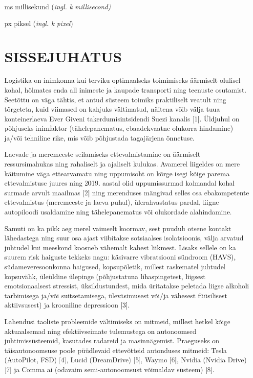 \documentclass[12pt,a4paper]{report}
\begin{document}
ms millisekund (\emph{ingl. k} \emph{millisecond)}

px piksel (\emph{ingl. k pixel})

\section*{SISSEJUHATUS}\label{sissejuhatus}

Logistika on inimkonna kui terviku optimaalseks toimimiseks äärmiselt olulisel kohal, hõlmates enda all inimeste ja kaupade transporti ning teenuste osutamist. Seetõttu on väga tähtis, et antud süsteem toimiks praktiliselt veatult ning tõrgeteta, kuid viimased on kahjuks vältimatud, näitena võib välja tuua konteinerlaeva Ever Giveni takerdumisintsidendi Suezi kanalis {[}1{]}. Üldjuhul on põhjuseks inimfaktor (tähelepanematus, ebaadekvaatne olukorra hindamine) ja/või tehniline rike, mis võib põhjustada tagajärjena õnnetuse.

Laevade ja meremeeste seilamiseks ettevalmistamine on äärmiselt ressursimahukas ning rahaliselt ja ajaliselt kulukas. Avamerel liigeldes on mere käitumine väga ettearvamatu ning uppumisoht on kõrge isegi kõige parema ettevalmistuse juures ning 2019. aastal olid uppumissurmad kolmandal kohal surmade arvult maailmas {[}2{]} ning merenduses mängivad selles osa ebakompetente ettevalmistus (meremeeste ja laeva puhul), ülerahvastatus pardal, liigne autopiloodi usaldamine ning tähelepanematus või olukordade alahindamine.

Samuti on ka pikk aeg merel vaimselt koormav, sest puudub otsene kontakt lähedastega ning suur osa ajast viibitakse sotsiaalses isolatsioonis, välja arvatud juhtudel kui meeskond koosneb vähemalt kahest liikmest. Lisaks sellele on ka suurem risk haiguste tekkeks nagu: käsivarre vibratsiooni sündroom (HAVS), südameveresoonkonna haigused, kopsupõletik, millest raskematel juhtudel kopsuvähk, üleüldine ülepinge (põhjustatuna lihaspingetest, liigsest emotsionaalsest stressist, üksildustundest, mida üritatakse peletada liigse alkoholi tarbimisega ja/või suitsetamisega, üleväsimusest või/ja vähesest füüsilisest aktiivsusest) ja krooniline depressioon {[}3{]}.

Lahendusi taoliste probleemide vältimiseks on mitmeid, millest hetkel kõige aktuaalsemad ning efektiivseimate tulemustega on autonoomsed juhtimissüsteemid, kasutades radareid ja masinnägemist. Praeguseks on täisautonoomsuse poole püüdlevaid ettevõtteid autonduses mitmeid: Tesla (AutoPilot, FSD) {[}4{]}, Lucid (DreamDrive) {[}5{]}, Waymo {[}6{]}, Nvidia (Nvidia Drive) {[}7{]} ja Comma ai (odavaim semi-autonoomsust võimaldav süsteem) {[}8{]}.
\end{document}
